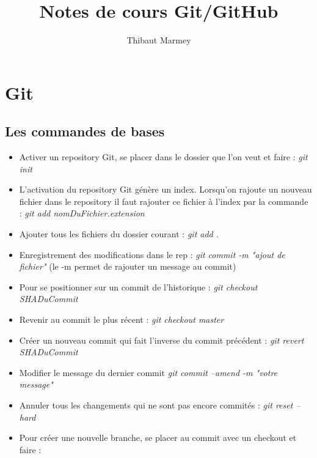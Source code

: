 \documentclass[12pt,a4paper]{article}
\author{Thibaut Marmey}
\title{Notes de cours Git/GitHub}
\begin{document}
	\maketitle

\begin{normalsize}
\tableofcontents
\end{normalsize}

\section{Git}
\subsection{Les commandes de bases}
\begin{itemize}
\item Activer un repository Git, se placer dans le dossier que l’on veut et faire : 
\newline \textit{git init }
\item L’activation du repository Git génère un index. Lorsqu’on rajoute un nouveau fichier dans le repository il faut rajouter ce fichier à l’index par la commande :
\newline \textit{git add nomDuFichier.extension}
\item Ajouter tous les fichiers du dossier courant :
\newline \textit{git add .}
\item Enregistrement des modifications dans le rep :
\newline \textit{git commit -m "ajout de fichier"} (le -m permet de rajouter un message au commit)
\item Pour se positionner sur un commit de l'historique :
\newline \textit{git checkout SHADuCommit}
\item Revenir au commit le plus récent : 
\newline \textit{git checkout master}
\item Créer un nouveau commit qui fait l'inverse du commit précédent :
\newline \textit{git revert SHADuCommit}
\item Modifier le message du dernier commit
\newline \textit{git commit --amend -m "votre message"}
\item Annuler tous les changements qui ne sont pas encore commités :
\newline \textit{git reset --hard}
\item Pour créer une nouvelle branche, se placer au commit avec un checkout et faire :

\end{itemize}
\end{document}
